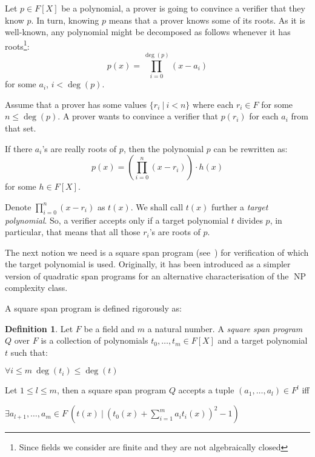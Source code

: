 \documentclass{article}
\theoremstyle{definition}
\newtheorem{definition}{Definition}[section]
\theoremstyle{remark}
\begin{document}
Let $p \in F[X]$ be a polynomial, a prover is going to convince a verifier that they know $p$. In turn, knowing $p$ means that a prover knows some of its roots. As it is well-known, 
any polynomial might be decomposed as follows whenever it has roots\footnote{Since fields we consider are finite and they are not algebraically closed}:
\begin{equation}
p(x) = \prod_{i = 0}^{\deg(p)} (x - a_i)
\end{equation}
for some $a_i$, $i < \deg(p)$.

Assume that a prover has some values $\{ r_i \: | \: i < n\}$ where each $r_i \in F$ for some $n \leq \deg(p)$.
A prover wants to convince a verifier that $p(r_i)$ for each $a_i$ from that set.

If there $a_i$'s are really roots of $p$, then the polynomial $p$ can be rewritten as:
\begin{equation}
p(x) = \left( \prod_{i = 0}^n (x - r_i) \right) \cdot h(x)
\end{equation}
for some $h \in F[X]$.

Denote $\prod_{i = 0}^n (x - r_i)$ as $t(x)$. We shall call $t(x)$ further a \emph{target polynomial}. So, a verifier accepts only if a target polynomial $t$ divides $p$, in particular, that means that all those $r_i$'s are roots of $p$.

The next notion we need is a square span program (see~\cite{danezis2014square}) for verification of which the target polynomial is used. Originally, it has been introduced as a simpler version of quadratic span programs for an alternative characterisation of the $\operatorname{NP}$ complexity class.

A square span program is defined rigorously as:
\begin{definition}
Let $F$ be a field and $m$ a natural number. A \emph{square span program} $Q$ over $F$ is a collection of polynomials $t_0, \dots, t_m \in F[X]$ and a target polynomial $t$ such that:
\begin{center}
$\forall i \leq m \: \deg(t_i) \leq \deg(t)$
\end{center}

Let $1 \leq l \leq m$, then a square span program $Q$ accepts a tuple $(a_1, \dots, a_l) \in F^l$ iff

\begin{center}
$\exists a_{l + 1}, \dots, a_m \in F \: \left( t(x) \: | \: {\left( t_0(x) + \sum \limits_{i = 1}^m a_i t_i(x) \right)}^2 - 1 \right)$
\end{center}
\end{definition}
\end{document}
